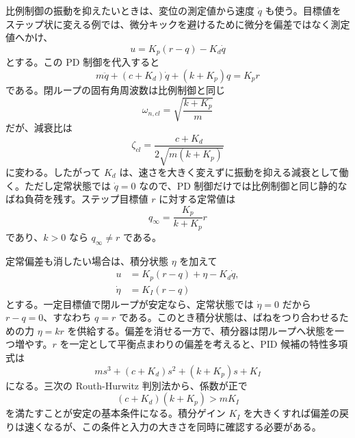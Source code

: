 比例制御の振動を抑えたいときは、変位の測定値から速度 $\dot{q}$ も使う。目標値をステップ状に変える例では、微分キックを避けるために微分を偏差ではなく測定値へかけ、
\begin{equation}
  u=K_p(r-q)-K_d\dot{q}
\end{equation}
とする。この PD 制御を代入すると
\begin{equation}
  m\ddot{q}+(c+K_d)\dot{q}+(k+K_p)q=K_pr
\end{equation}
である。閉ループの固有角周波数は比例制御と同じ
\begin{equation}
  \omega_{n,cl}=\sqrt{\frac{k+K_p}{m}}
\end{equation}
だが、減衰比は
\begin{equation}
  \zeta_{cl}=
  \frac{c+K_d}{2\sqrt{m(k+K_p)}}
\end{equation}
に変わる。したがって $K_d$ は、速さを大きく変えずに振動を抑える減衰として働く。ただし定常状態では $\dot{q}=0$ なので、PD 制御だけでは比例制御と同じ静的なばね負荷を残す。ステップ目標値 $r$ に対する定常値は
\begin{equation}
  q_\infty=\frac{K_p}{k+K_p}r
\end{equation}
であり、$k>0$ なら $q_\infty\neq r$ である。

定常偏差も消したい場合は、積分状態 $\eta$ を加えて
\begin{align}
  u&=K_p(r-q)+\eta-K_d\dot{q},\\
  \dot{\eta}&=K_I(r-q)
\end{align}
とする。一定目標値で閉ループが安定なら、定常状態では $\dot{\eta}=0$ だから $r-q=0$、すなわち $q=r$ である。このとき積分状態は、ばねをつり合わせるための力 $\eta=kr$ を供給する。偏差を消せる一方で、積分器は閉ループへ状態を一つ増やす。$r$ を一定として平衡点まわりの偏差を考えると、PID 候補の特性多項式は
\begin{equation}
  ms^3+(c+K_d)s^2+(k+K_p)s+K_I
\end{equation}
になる。三次の Routh-Hurwitz 判別法から、係数が正で
\begin{equation}
  (c+K_d)(k+K_p)>mK_I
\end{equation}
を満たすことが安定の基本条件になる。積分ゲイン $K_I$ を大きくすれば偏差の戻りは速くなるが、この条件と入力の大きさを同時に確認する必要がある。

